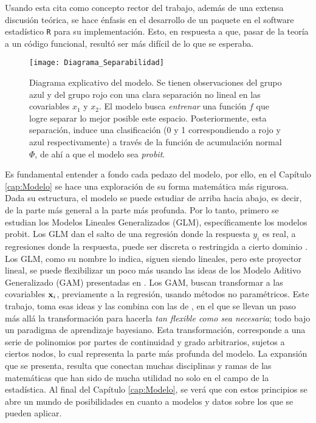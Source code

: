 \documentclass[../Main/Main.tex]{subfiles}
\begin{document}
Usando esta cita como concepto rector del trabajo, además de una extensa discusión teórica, se hace énfasis en el desarrollo de un paquete en el software estadístico \verb|R| para su implementación. Esto, en respuesta a que, pasar de la teoría a un código funcional, resultó ser más difícil de lo que se esperaba. \\

\begin{figure}[h]
  \centering
      \texttt{[image: Diagrama\_Separabilidad]}
  \caption{Diagrama explicativo del modelo. Se tienen observaciones del grupo azul y del grupo rojo con una clara separación no lineal en las covariables $x_1$ y $x_2$. El modelo busca \textit{entrenar} una función $f$ que logre separar lo mejor posible este espacio. Posteriormente, esta separación, induce una clasificación (0 y 1 correspondiendo a rojo y azul respectivamente) a través de la función de acumulación normal $\Phi$, de ahí a que el modelo sea \textit{probit}.}
 \label{fig:DiagramaIntro}
\end{figure}

Es fundamental entender a fondo cada pedazo del modelo, por ello, en el Capítulo \ref{cap:Modelo} se hace una exploración de su forma matemática más rigurosa. Dada su estructura, el modelo  se puede estudiar de arriba hacia abajo, es decir, de la parte más general a la parte más profunda. Por lo tanto, primero se estudian los Modelos Lineales Generalizados (GLM), específicamente los modelos probit. Los GLM dan el salto de una regresión donde la respuesta $y_i$ es real, a regresiones donde la respuesta, puede ser discreta o restringida a cierto dominio \autocite{maccullagh1989generalized}. Los GLM, como su nombre lo indica, siguen siendo lineales, pero este proyector lineal, se puede flexibilizar un poco más usando las ideas de los Modelo Aditivo Generalizado (GAM) presentadas en \autocite{hastie1986generalized}. Los GAM, buscan transformar a las covariables $\mathbf{x}_i$, previamente a la regresión, usando métodos no paramétricos. Este trabajo, toma esas ideas y las combina con las de \autocite{mallik1998automatic}, en el que se llevan un paso más allá la transformación para hacerla \textit{tan flexible como sea necesaria}; todo bajo un paradigma de aprendizaje bayesiano. Esta transformación, corresponde a una serie de polinomios por partes de continuidad y grado arbitrarios, sujetos a ciertos nodos, lo cual representa la parte más profunda del modelo. La expansión que se presenta, resulta que conectan muchas disciplinas y ramas de las matemáticas que han sido de mucha utilidad no solo en el campo de la estadística. Al final del Capítulo \ref{cap:Modelo}, se verá que con estos principios se abre un mundo de posibilidades en cuanto a modelos y datos sobre los que se pueden aplicar.\\
\end{document}
